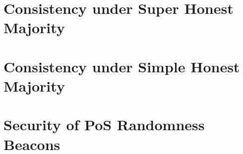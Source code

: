 \documentclass[12pt,oneside]{book}
\begin{document}

\singlespacing
\tableofcontents
\thispagestyle{plain}
\mainmatter
\doublespacing





\part{Consistency under Super Honest Majority}


\part{Consistency under Simple Honest Majority}


\part{Security of PoS Randomness Beacons}



\singlespacing
\newpage
{}
  


\appendix
{}

\end{document}

